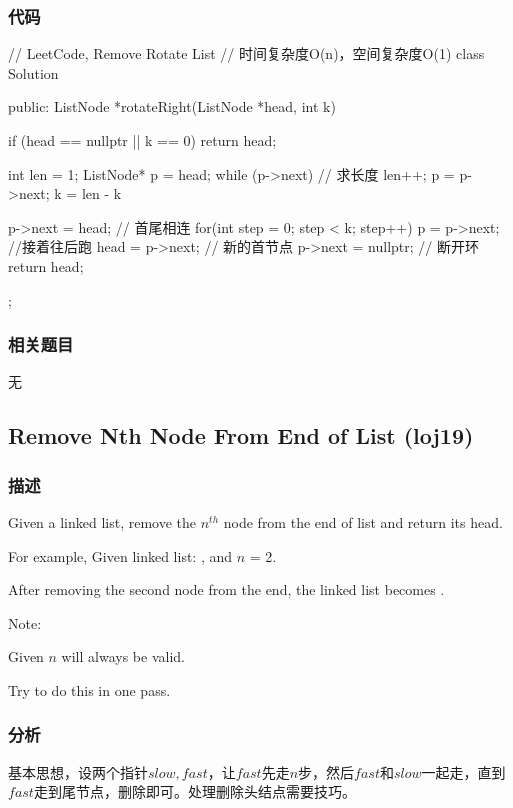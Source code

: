 \subsubsection{代码}
\begin{Code}
// LeetCode, Remove Rotate List
// 时间复杂度O(n)，空间复杂度O(1)
class Solution {
public:
    ListNode *rotateRight(ListNode *head, int k) {
        if (head == nullptr || k == 0) return head;

        int len = 1;
        ListNode* p = head;
        while (p->next) { // 求长度
            len++;
            p = p->next;
        }
        k = len - k %

        p->next = head; // 首尾相连
        for(int step = 0; step < k; step++) {
            p = p->next;  //接着往后跑
        }
        head = p->next; // 新的首节点
        p->next = nullptr; // 断开环
        return head;
    }
};
\end{Code}


\subsubsection{相关题目}

\begindot
\item 无
\myenddot


\subsection{Remove Nth Node From End of List (loj19)}
\label{sec:remove-nth-node-from-end-of-list}


\subsubsection{描述}
Given a linked list, remove the $n^{th}$ node from the end of list and return its head.

For example, Given linked list: , and $n$ = 2.

After removing the second node from the end, the linked list becomes .

Note:
\begindot
\item Given $n$ will always be valid.
\item Try to do this in one pass.
\myenddot


\subsubsection{分析}
基本思想，设两个指针$slow,fast$，让$fast$先走$n$步，然后$fast$和$slow$一起走，直到$fast$走到尾节点，删除即可。处理删除头结点需要技巧。

